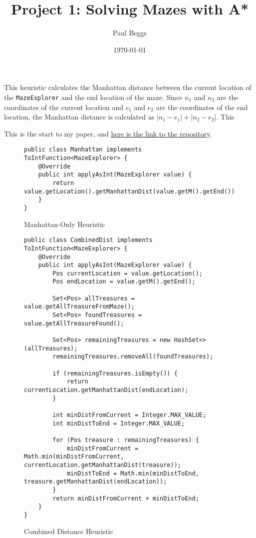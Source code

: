 \documentclass[12pt]{article}
\title{Project 1: Solving Mazes with A*}
\author{Paul Beggs}
\date{\today}
\begin{document}
\maketitle




This heuristic calculates the Manhattan distance between the current location of the \texttt{MazeExplorer} and the end location of the maze. Since \(n_{1}\) and \(n_{2}\) are the coordinates of the current location and \(e_{1}\) and \(e_{2}\) are the coordinates of the end location, the Manhattan distance is calculated as \(|n_{1} - e_{1}| + |n_{2} - e_{2}|\). This

This is the start to my paper, and \href{https://github.com/PaulBeggs/A_Star}{here is the link to the repository}.

\begin{figure}[h!]
\begin{verbatim}
public class Manhattan implements ToIntFunction<MazeExplorer> {
    @Override
    public int applyAsInt(MazeExplorer value) {
        return value.getLocation().getManhattanDist(value.getM().getEnd());
    }
}
\end{verbatim}
    \caption{Manhattan-Only Heuristic}
\end{figure}

\begin{figure}[h!]
\begin{verbatim}
public class CombinedDist implements ToIntFunction<MazeExplorer> {
    @Override
    public int applyAsInt(MazeExplorer value) {
        Pos currentLocation = value.getLocation();
        Pos endLocation = value.getM().getEnd();

        Set<Pos> allTreasures = value.getAllTreasureFromMaze();
        Set<Pos> foundTreasures = value.getAllTreasureFound();

        Set<Pos> remainingTreasures = new HashSet<>(allTreasures);
        remainingTreasures.removeAll(foundTreasures);

        if (remainingTreasures.isEmpty()) {
            return currentLocation.getManhattanDist(endLocation);
        }

        int minDistFromCurrent = Integer.MAX_VALUE;
        int minDistToEnd = Integer.MAX_VALUE;

        for (Pos treasure : remainingTreasures) {
            minDistFromCurrent = Math.min(minDistFromCurrent, currentLocation.getManhattanDist(treasure));
            minDistToEnd = Math.min(minDistToEnd, treasure.getManhattanDist(endLocation));
        }
        return minDistFromCurrent + minDistToEnd;
    }
}
\end{verbatim}
    \caption{Combined Distance Heuristic}
\end{figure}
\end{document}

